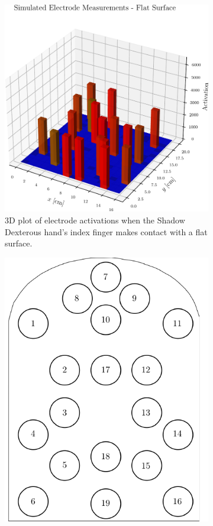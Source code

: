 \begin{figure}[h]
	\centering
	\begin{subfigure}[b]{0.48\textwidth}
		\centering
		\includegraphics[width=\textwidth]{chapters/1-tactile-perception/fig/matplotlib/pressure-distribution.pdf}
		\caption{3D plot of electrode activations when the Shadow Dexterous hand's index finger makes contact with a flat surface.}
		\label{fig:simulated-electrode-distribution}
	\end{subfigure}
	\hfill
	\begin{subfigure}[b]{0.48\textwidth}
		\centering
		\includegraphics[height=\textwidth]{chapters/1-tactile-perception/fig/drawio/electrode-map.pdf}

\end{subfigure}
\end{figure}
